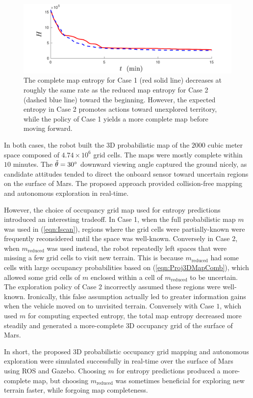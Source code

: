 \documentclass[conf]{new-aiaa}
\newcommand{\refeqn}[1]{(\ref{eqn:#1})}
\begin{document}
	\begin{figure}
		\centerline{
			\includegraphics[width=0.6\columnwidth]{scitech_entropy_comparison_flat.pdf}
		}
		\caption{The complete map entropy for Case 1 (red solid line) decreases at roughly the same rate as the reduced map entropy for Case 2 (dashed blue line) toward the beginning. However, the expected entropy in Case 2 promotes actions toward unexplored territory, while the policy of Case 1 yields a more complete map before moving forward.}
		\label{fig:mars3Dentropy}
	\end{figure}


In both cases, the robot built the 3D probabilistic map of the $2000$ cubic meter space composed of $4.74\times10^6$ grid cells. The maps were mostly complete within $10$ minutes. The $\tilde{\theta}=30\degree$ downward viewing angle captured the ground nicely, as candidate attitudes tended to direct the onboard sensor toward uncertain regions on the surface of Mars. The proposed approach provided collision-free mapping and autonomous exploration in real-time.

However, the choice of occupancy grid map used for entropy predictions introduced an interesting tradeoff. In Case 1, when the full probabilistic map $m$ was used in \refeqn{Iscan}, regions where the grid cells were partially-known were frequently reconsidered until the space was well-known. Conversely in Case 2, when $m_\text{reduced}$ was used instead, the robot repeatedly left spaces that were missing a few grid cells to visit new terrain. This is because $m_\text{reduced}$ had some cells with large occupancy probabilities based on \refeqn{Proj3DMapComb}, which allowed some grid cells of $m$ enclosed within a cell of $m_\text{reduced}$ to be uncertain. The exploration policy of Case 2 incorrectly assumed these regions were well-known. Ironically, this false assumption actually led to greater information gains when the vehicle moved on to unvisited terrain. Conversely with Case $1$, which used $m$ for computing expected entropy, the total map entropy decreased more steadily and generated a more-complete 3D occupancy grid of the surface of Mars.

In short, the proposed 3D probabilistic occupancy grid mapping and autonomous exploration were simulated successfully in real-time over the surface of Mars using ROS and Gazebo. Choosing $m$ for entropy predictions produced a more-complete map, but choosing $m_\text{reduced}$ was sometimes beneficial for exploring new terrain faster, while forgoing map completeness.
\end{document}
